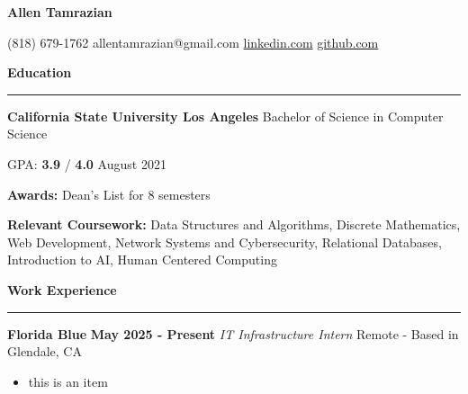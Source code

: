 \documentclass[11pt]{article}
\begin{document}
\begin{center}
{\large{\textbf{\huge{Allen Tamrazian}}}}


\textnormal{(818) 679-1762} {\textbar}
allentamrazian@gmail.com {\textbar}
\href{https://www.linkedin.com/in/allen-tamrazian-345406225/}{linkedin.com} {\textbar}
\href{https://github.com/AllenTamrazian}{github.com}

\end{center}
\textbf{Education} 
\vspace{-10pt}
\newline
\rule{\textwidth}{0.4pt}

\raggedright{
    \textbf{California State University Los Angeles}
    \hfill{Bachelor of Science in Computer Science}

    GPA: \textbf{3.9} / \textbf{4.0}
    \hfill{August 2021}

    \textbf{Awards: }Dean's List for 8 semesters
    \newline

    \textbf{Relevant Coursework:} 
    Data Structures and Algorithms, 
    Discrete Mathematics, 
    Web Development, 
    Network Systems and Cybersecurity, 
    Relational Databases, 
    Introduction to AI, 
    Human Centered Computing
}
\newline


\textbf{Work Experience}
\vspace{-10pt}
\newline
\rule{\textwidth}{0.4pt}

\textbf{Florida Blue}
\hfill
\textbf{May 2025 - Present}
\newline
\textit{IT Infrastructure Intern}%
\hfill
Remote - Based in Glendale, CA

\begin{itemize}[itemsep=0pt, topsep=0pt]
    \item this is an item
\end{itemize}
\end{document}
